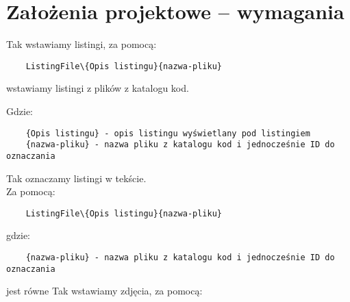 	\newpage
\section{Założenia projektowe – wymagania}		%



Tak wstawiamy listingi, za pomocą:

  \begin{verbatim}
	ListingFile\{Opis listingu}{nazwa-pliku} 
 \end{verbatim}
	
	wstawiamy listingi z plików z katalogu kod.

Gdzie:
\begin{verbatim}
	{Opis listingu} - opis listingu wyświetlany pod listingiem
	{nazwa-pliku} - nazwa pliku z katalogu kod i jednocześnie ID do oznaczania
\end{verbatim}

Tak oznaczamy listingi  w tekście.\\Za pomocą:

\begin{verbatim}
	ListingFile\{Opis listingu}{nazwa-pliku} 
\end{verbatim}

gdzie:

\begin{verbatim}
	{nazwa-pliku} - nazwa pliku z katalogu kod i jednocześnie ID do oznaczania
\end{verbatim}



\clearpage


jest równe 
\clearpage
Tak wstawiamy zdjęcia, za pomocą:


